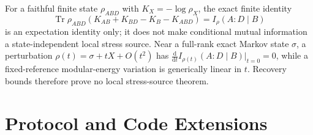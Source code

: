 \documentclass[11pt]{article}
\theoremstyle{remark}
\theoremstyle{plain}
\begin{document}
For a faithful finite state \(\rho_{ABD}\) with \(K_X=-\log\rho_X\), the
exact finite identity
\[
  \operatorname{Tr}\rho_{ABD}(K_{AB}+K_{BD}-K_B-K_{ABD})
  =
  I_\rho(A:D\mid B)
\]
is an expectation identity only; it does not make conditional mutual
information a state-independent local stress source. Near a full-rank exact
Markov state \(\sigma\), a perturbation \(\rho(t)=\sigma+tX+O(t^2)\) has
\(\frac{\mathrm d}{\mathrm d t}I_{\rho(t)}(A:D\mid B)|_{t=0}=0\), while a
fixed-reference modular-energy variation is generically linear in \(t\).
Recovery bounds therefore prove no local stress-source theorem.



\section{Protocol and Code Extensions}\label{app:bft-qecc}

\end{document}
